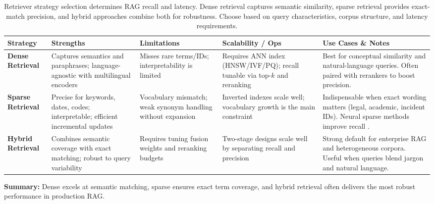 \begin{table}[tb]
\centering
\small
\caption{Retriever strategy selection determines RAG recall and latency. Dense retrieval captures semantic similarity, sparse retrieval provides exact-match precision, and hybrid approaches combine both for robustness. Choose based on query characteristics, corpus structure, and latency requirements.}
\label{tab:ch08_retriever_strategies}
\begin{threeparttable}
\setlength{\tabcolsep}{6pt}
\renewcommand{\arraystretch}{1.3}
\begin{tabularx}{0.95\linewidth}{@{}>{\raggedright\arraybackslash}p{2.5cm}>{\raggedright\arraybackslash}X>{\raggedright\arraybackslash}X>{\raggedright\arraybackslash}X>{\raggedright\arraybackslash}X@{}}
\toprule
\rowcolor{gray!15}
\textbf{Strategy} & \textbf{Strengths} & \textbf{Limitations} & \textbf{Scalability / Ops} & \textbf{Use Cases \& Notes} \\
\midrule
\textbf{Dense Retrieval} 
& Captures semantics and paraphrases; language-agnostic with multilingual encoders \cite{Karpukhin2020DPR} 
& Misses rare terms/IDs; interpretability is limited \cite{Thakur2021BEIR} 
& Requires ANN index (HNSW/IVF/PQ); recall tunable via top-$k$ and reranking \cite{Johnson2019FAISS,Malkov2018HNSW} 
& Best for conceptual similarity and natural-language queries. Often paired with rerankers to boost precision. \\
\addlinespace[4pt]

\textbf{Sparse Retrieval} 
& Precise for keywords, dates, codes; interpretable; efficient incremental updates \cite{robertson2009bm25} 
& Vocabulary mismatch; weak synonym handling without expansion 
& Inverted indexes scale well; vocabulary growth is the main constraint 
& Indispensable when exact wording matters (legal, academic, incident IDs). Neural sparse methods improve recall \cite{Lin2021SPLADE}. \\
\addlinespace[4pt]

\textbf{Hybrid Retrieval} 
& Combines semantic coverage with exact matching; robust to query variability \cite{Thakur2021BEIR,Lin2021SPLADE} 
& Requires tuning fusion weights and reranking budgets 
& Two-stage designs scale well by separating recall and precision 
& Strong default for enterprise RAG and heterogeneous corpora. Useful when queries blend jargon and natural language. \\
\bottomrule
\end{tabularx}
\begin{tablenotes}\footnotesize
\item \textbf{Summary:} Dense excels at semantic matching, sparse ensures exact term coverage, and hybrid retrieval often delivers the most robust performance in production RAG.
\end{tablenotes}
\end{threeparttable}
\end{table}

